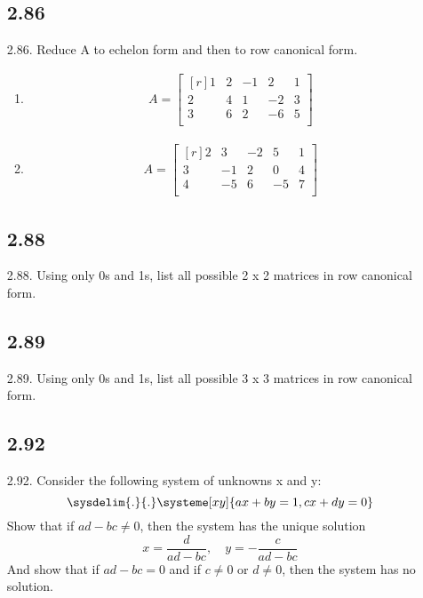 \documentclass{report}
\theoremstyle{plain}
\theoremstyle{definition}
\theoremstyle{plain}
\begin{document}
\begin{enumerate}
\subsection{2.86}
\item [2.86.] Reduce A to echelon form and then to row canonical form.
	\begin{enumerate}
	\item
	\begin{align*}
	A = 
	\begin{bmatrix*}[r]
	1 & 2 & -1 & 2 & 1\\
	2 & 4 & 1 & -2 & 3\\
	3 & 6 & 2 & -6 & 5\\
	\end{bmatrix*}
	\end{align*}
	\item
	\begin{align*}
	A = 
	\begin{bmatrix*}[r]
	2 & 3 & -2 & 5 & 1\\
	3 & -1 & 2 & 0 & 4\\
	4 & -5 & 6 & -5 & 7\\
	\end{bmatrix*}
	\end{align*}
	\end{enumerate}
\subsection{2.88}
\item [2.88.] Using only 0s and 1s, list all possible 2 x 2 matrices in row canonical form.
\subsection{2.89}
\item [2.89.] Using only 0s and 1s, list all possible 3 x 3 matrices in row canonical form.
\subsection{2.92}
\item [2.92.] Consider the following system of unknowns x and y:
\[ \sysdelim{.}{.}\systeme[xy]{ax+by=1,cx+dy=0} \]
Show that if $ad-bc \neq 0$, then the system has the unique solution
\[ x=\frac{d}{ad-bc}, \quad y=-\frac{c}{ad-bc} \]
And show that if $ad-bc=0$ and if $c \neq 0$ or $d \neq 0$, then the system has no solution.
\end{enumerate}
\end{document}
